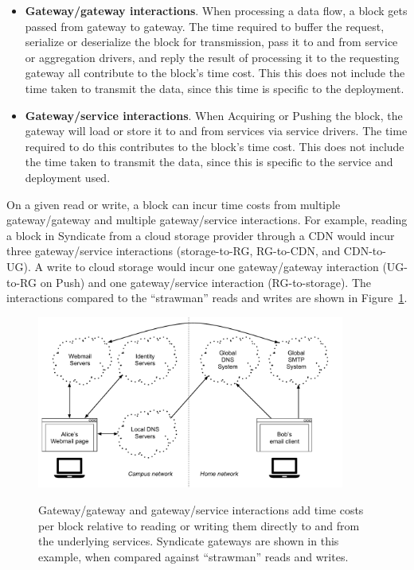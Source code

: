 \begin{itemize}

\item \textbf{Gateway/gateway interactions}.  When processing a data flow,
a block gets passed from gateway to gateway.  The time required to buffer the
request, serialize or deserialize the block for transmission, pass it to and from
service or aggregation drivers, and reply the result of processing it
to the requesting gateway all contribute to the block's time cost.  This
this does not include the time taken to transmit the data, since this time is
specific to the deployment.

\item \textbf{Gateway/service interactions}.  When Acquiring or Pushing the
block, the gateway will load or store it to and from services via service
drivers.  The time required to do this contributes to the block's time cost.
This does not include the time taken to transmit the data, since this is
specific to the service and deployment used.

\end{itemize}

On a given read or write, a block can incur time costs from 
multiple gateway/gateway and multiple gateway/service interactions.
For example, reading a block in Syndicate from a cloud storage provider through
a CDN would incur three gateway/service interactions (storage-to-RG, RG-to-CDN,
and CDN-to-UG).  A write to cloud storage would incur one gateway/gateway interaction (UG-to-RG
on Push) and one gateway/service interaction (RG-to-storage).  The interactions
compared to the ``strawman'' reads and writes are shown in
Figure~\ref{fig:evaluation-time-cost-overview}.

\begin{figure}[h]
   \caption{Gateway/gateway and gateway/service interactions add time costs per
block relative to reading or writing them directly to and from the underlying
services.  Syndicate gateways are shown in this example, when compared against
``strawman'' reads and writes.}
   \centering
   \includegraphics[width=0.9\textwidth,page=29]{figures/dissertation-figures}
   \label{fig:evaluation-time-cost-overview}
\end{figure}


